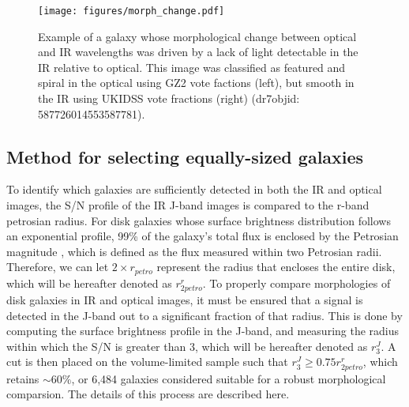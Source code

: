 \begin{figure}
\centering
\texttt{[image: figures/morph\_change.pdf]}
\caption{Example of a galaxy whose morphological change between optical and IR wavelengths was driven by a lack of light detectable in the IR relative to optical. This image was classified as featured and spiral in the optical using GZ2 vote factions (left), but smooth in the IR using UKIDSS vote fractions (right) (dr7objid: 587726014553587781).}%
\label{fig:morph_change}
\end{figure}


\subsection{Method for selecting equally-sized galaxies}

To identify which galaxies are sufficiently detected in both the IR and optical images, the S/N profile of the IR J-band images is compared to the r-band petrosian radius. For disk galaxies whose surface brightness distribution follows an exponential profile, 99\% of the galaxy's total flux is enclosed by the Petrosian magnitude \citep{Graham2005}, which is defined as the flux measured within two Petrosian radii. Therefore, we can let $2\times r_{petro}$ represent the radius that encloses the entire disk, which will be hereafter denoted as $r^{r}_{2petro}$. To properly compare morphologies of disk galaxies in IR and optical images, it must be ensured that a signal is detected in the J-band out to a significant fraction of that radius. This is done by computing the surface brightness profile in the J-band, and measuring the radius within which the S/N is greater than 3, which will be hereafter denoted as $r^{J}_{3}$. A cut is then placed on the volume-limited sample such that $r^{J}_{3} \ge 0.75  r^{r}_{2petro}$, which retains $\sim 60\%$, or 6,484 galaxies considered suitable for a robust morphological comparsion. The details of this process are described here. 


